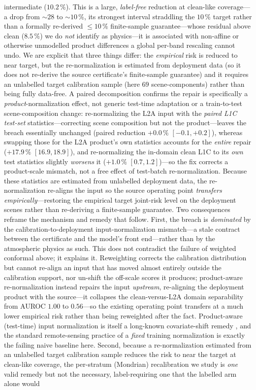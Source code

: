 \documentclass[preprint,3p,times]{elsarticle}
\begin{document}
intermediate ($10.2\,\%$). This is a large, \emph{label-free} reduction at clean-like coverage---a drop from ${\sim}28$ to ${\sim}10\,\%$, its strongest interval straddling the $10\,\%$ target rather than a formally re-derived $\leq\!10\,\%$ finite-sample guarantee---whose residual above clean ($8.5\,\%$) we do \emph{not} identify as physics---it is associated with non-affine or otherwise unmodelled product differences a global per-band rescaling cannot undo. We are explicit that three things differ: the \emph{empirical} risk is reduced to near target, but the re-normalization is estimated from deployment data (so it does not re-derive the source certificate's finite-sample guarantee) and it requires an unlabelled target calibration sample (here $69$ scene-components) rather than being fully data-free. A paired decomposition confirms the repair is specifically a \emph{product}-normalization effect, not generic test-time adaptation or a train-to-test scene-composition change: re-normalizing the L2A input with the \emph{paired L1C test-set} statistics---correcting scene composition but not the product---leaves the breach essentially unchanged (paired reduction $+0.0\,\%$ $[-0.1,+0.2]$), whereas swapping those for the L2A product's own statistics accounts for the \emph{entire} repair ($+17.9\,\%$ $[16.9,18.9]$), and re-normalizing the in-domain clean L1C to its \emph{own} test statistics slightly \emph{worsens} it ($+1.0\,\%$ $[0.7,1.2]$)---so the fix corrects a product-scale mismatch, not a free effect of test-batch re-normalization. Because these statistics are estimated from unlabelled deployment data, the re-normalization re-aligns the input so the source operating point \emph{transfers empirically}---restoring the empirical target joint-risk level on the deployment scenes rather than re-deriving a finite-sample guarantee. Two consequences reframe the mechanism and remedy that follow. First, the breach is \emph{dominated} by the calibration-to-deployment input-normalization mismatch---a stale contract between the certificate and the model's front end---rather than by the atmospheric physics as such. This does not contradict the failure of weighted conformal above; it explains it. Reweighting corrects the calibration distribution but cannot re-align an input that has moved almost entirely outside the calibration support, nor un-shift the off-scale scores it produces; product-aware re-normalization instead repairs the input \emph{upstream}, re-aligning the deployment product with the source---it collapses the clean-versus-L2A domain separability from AUROC $1.00$ to $0.56$---so the existing operating point transfers at a much lower empirical risk rather than being reweighted after the fact. Product-aware (test-time) input normalization is itself a long-known covariate-shift remedy \citep{adabn2016,schneider2020,nado2020,benz2021}, and the standard remote-sensing practice of a \emph{fixed} training normalization \citep{corley2024} is exactly the failing naive baseline here. Second, because a re-normalization estimated from an unlabelled target calibration sample reduces the risk to near the target at clean-like coverage, the per-stratum (Mondrian) recalibration we study is \emph{one} valid remedy but not the necessary, label-requiring one that the labelled arm alone would 
\end{document}
